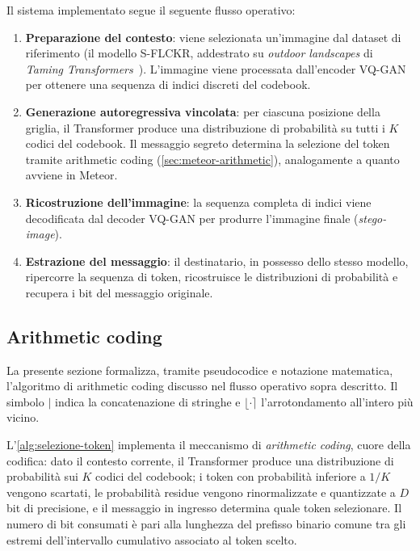 Il sistema implementato segue il seguente flusso operativo:

\begin{enumerate}
	\item \textbf{Preparazione del contesto}: viene selezionata un'immagine dal dataset di riferimento (il modello S-FLCKR, addestrato su \emph{outdoor landscapes} di \emph{Taming Transformers}~\cite{esser-2020}). L'immagine viene processata dall'encoder VQ-GAN per ottenere una sequenza di indici discreti del codebook.

	\item \textbf{Generazione autoregressiva vincolata}: per ciascuna posizione della griglia, il Transformer produce una distribuzione di probabilità su tutti i $K$ codici del codebook. Il messaggio segreto determina la selezione del token tramite arithmetic coding (\autoref{sec:meteor-arithmetic}), analogamente a quanto avviene in Meteor.

	\item \textbf{Ricostruzione dell'immagine}: la sequenza completa di indici viene decodificata dal decoder VQ-GAN per produrre l'immagine finale (\emph{stego-image}).

	\item \textbf{Estrazione del messaggio}: il destinatario, in possesso dello stesso modello, ripercorre la sequenza di token, ricostruisce le distribuzioni di probabilità e recupera i bit del messaggio originale.
\end{enumerate}

\subsection{Arithmetic coding}\label{sec:algoritmi}

La presente sezione formalizza, tramite pseudocodice e notazione matematica, l'algoritmo di arithmetic coding discusso nel flusso operativo sopra descritto. Il simbolo $|$ indica la concatenazione di stringhe e $\lfloor\cdot\rceil$ l'arrotondamento all'intero più vicino.

L'\autoref{alg:selezione-token} implementa il meccanismo di \emph{arithmetic coding}, cuore della codifica: dato il contesto corrente, il Transformer produce una distribuzione di probabilità sui $K$ codici del codebook; i token con probabilità inferiore a $1/K$ vengono scartati, le probabilità residue vengono rinormalizzate e quantizzate a $D$ bit di precisione, e il messaggio in ingresso determina quale token selezionare. Il numero di bit consumati è pari alla lunghezza del prefisso binario comune tra gli estremi dell'intervallo cumulativo associato al token scelto.

